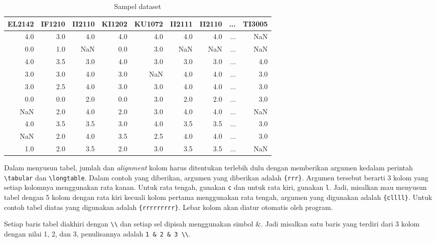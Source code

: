 \begin{table}[H]
    \centering
    \caption{Sampel dataset}
    \label{tabel:sampel_dataset}
    \begin{tabular}{rrrrrrrrr}
     \toprule
     EL2142 & IF1210 & II2110 & KI1202 & KU1072 & II2111 & II2110 & ... & TI3005\\
     \midrule
     4.0 & 3.0 & 4.0 & 4.0 & 4.0 & 4.0 & 4.0 & ... & NaN \\
     0.0 & 1.0 & NaN & 0.0 & 3.0 & NaN & NaN & ... & NaN \\
     4.0 & 3.5 & 3.0 & 4.0 & 3.0 & 3.0 & 3.0 & ... & 4.0 \\
     3.0 & 3.0 & 4.0 & 3.0 & NaN & 4.0 & 4.0 & ... & 3.0 \\
     3.0 & 2.5 & 4.0 & 3.0 & 3.0 & 4.0 & 4.0 & ... & 3.0 \\
     0.0 & 0.0 & 2.0 & 0.0 & 3.0 & 2.0 & 2.0 & ... & 3.0 \\
     NaN & 2.0 & 4.0 & 2.0 & 3.0 & 4.0 & 4.0 & ... & NaN \\
     4.0 & 3.5 & 3.5 & 3.0 & 4.0 & 3.5 & 3.5 & ... & 3.0 \\
     NaN & 2.0 & 4.0 & 3.5 & 2.5 & 4.0 & 4.0 & ... & 3.0 \\
     1.0 & 2.0 & 3.5 & 2.0 & 3.0 & 3.5 & 3.5 & ... & NaN \\
     \bottomrule
    \end{tabular}
\end{table}

Dalam menyusun tabel, jumlah dan \textit{alignment} kolom harus ditentukan terlebih dulu dengan memberikan argumen kedalam perintah \verb|\tabular| dan \verb|\longtable|. Dalam contoh yang diberikan, argumen yang diberikan adalah \verb|{rrr}|. Argumen tersebut berarti 3 kolom yang setiap kolomnya menggunakan rata kanan. Untuk rata tengah, gunakan \texttt{c} dan untuk rata kiri, gunakan \texttt{l}. Jadi, misalkan mau menyusun tabel dengan 5 kolom dengan rata kiri kecuali kolom pertama menggunakan rata tengah, argumen yang digunakan adalah \verb|{cllll}|. Untuk contoh tabel diatas yang digunakan adalah \verb|{rrrrrrrrr}|. Lebar kolom akan diatur otomatis oleh program. 

Setiap baris tabel diakhiri dengan \verb|\\| dan setiap sel dipisah menggunakan simbol \&. Jadi misalkan satu baris yang terdiri dari 3 kolom dengan nilai 1, 2, dan 3, penulisannya adalah \verb|1 & 2 & 3 \\|.

